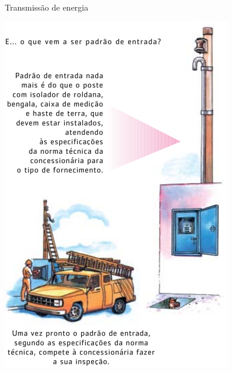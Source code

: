 \begin{frame}{Transmissão de energia}

	\centering
	\includegraphics[height=0.9\textheight]{Figuras/Ch03/fig20}
\end{frame}


